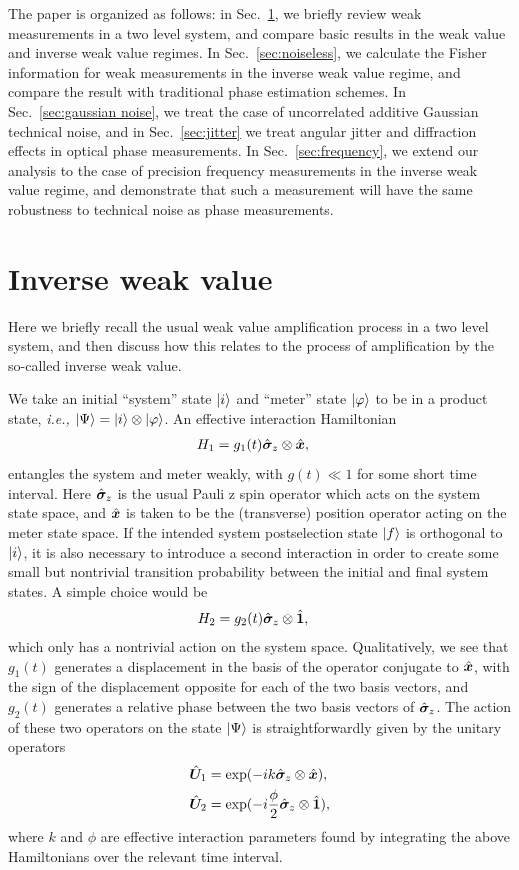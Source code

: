 The paper is organized as follows: in Sec.~\ref{sec:inverse weak values}, we briefly review weak measurements in a two level system, and compare basic results in the weak value and inverse weak value regimes.  In Sec.~\ref{sec:noiseless}, we calculate the Fisher information for weak measurements in the inverse weak value regime, and compare the result with traditional phase estimation schemes. In Sec.~\ref{sec:gaussian noise}, we treat the case of uncorrelated additive Gaussian technical noise, and in Sec.~\ref{sec:jitter} we treat angular jitter and diffraction effects in optical phase measurements.  In Sec.~\ref{sec:frequency}, we extend our analysis to the case of precision frequency measurements in the inverse weak value regime, and demonstrate that such a measurement will have the same robustness to technical noise as phase measurements.

\section{Inverse weak value}\label{sec:inverse weak values}
Here we briefly recall the usual weak value amplification process in a two level system, and then discuss how this relates to the process of amplification by the so-called inverse weak value.  

We take an initial ``system'' state $\lvert i\rangle$ and ``meter'' state $\lvert \varphi\rangle$ to be in a product state, \emph{i.e.,} $\lvert \Psi\rangle = \lvert i\rangle \otimes \lvert \varphi\rangle$.  An effective interaction Hamiltonian 
\begin{align}\label{eq:kick hamiltonian}
	H_1 &= g_1(t) \hat{\bm \sigma}_z \otimes \hat{\bm x},
\end{align}
entangles the system and meter weakly, with $g(t) \ll 1$ for some short time interval.  Here $\hat{\bm \sigma}_z$ is the usual Pauli z spin operator which acts on the system state space, and $\hat{\bm x}$ is taken to be the (transverse) position operator acting on the meter state space.  If the intended system postselection state $\lvert f\rangle$ is orthogonal to $\lvert i\rangle$, it is also necessary to introduce a second interaction in order to create some small but nontrivial transition probability between the initial and final system states.  A simple choice would be 
\begin{align}\label{eq:phase hamiltonian}
	H_2 &= g_2(t) \hat{\bm \sigma}_z \otimes \hat{\bm 1},
\end{align}
which only has a nontrivial action on the system space.  Qualitatively, we see that $g_1(t)$ generates a displacement in the basis of the operator conjugate to $\hat{\bm x}$, with the sign of the displacement opposite for each of the two basis vectors, and $g_2(t)$ generates a relative phase between the two basis vectors of $\hat{\bm \sigma}_z$.  The action of these two operators on the state $\lvert \Psi\rangle$ is straightforwardly given by the unitary operators 
\begin{align}
	\nonumber\hat{\bm U}_1 &= \exp(-i k \hat{\bm \sigma}_z \otimes \hat{\bm x}), \\
	\hat{\bm U}_2 &= \exp(-i  \frac{\phi}{2} \hat{\bm \sigma}_z \otimes \hat{\bm 1}),
\end{align}
where $k$ and $\phi$ are effective interaction parameters found by integrating the above Hamiltonians over the relevant time interval.  

